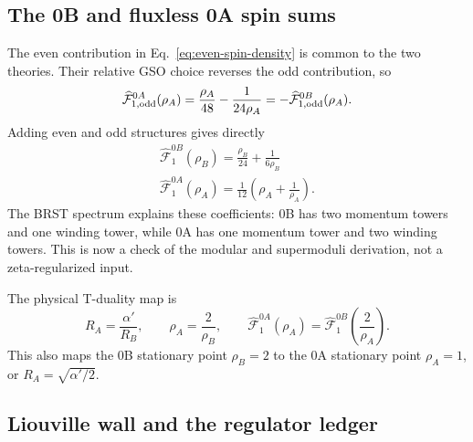 \documentclass[11pt]{article}
\newcommand{\ap}{\alpha'}
\begin{document}
\subsection{The 0B and fluxless 0A spin sums}

The even contribution in Eq.~\eqref{eq:even-spin-density} is common to the
two theories.  Their relative GSO choice reverses the odd contribution, so
\begin{equation}
 \widehat{\mathcal F}_{1,\rm odd}^{0A}(\rho_A)
 =\frac{\rho_A}{48}-\frac1{24\rho_A}
 =-\widehat{\mathcal F}_{1,\rm odd}^{0B}(\rho_A).
 \label{eq:odd-spin-density-0a}
\end{equation}
Adding even and odd structures gives directly
\begin{align}
 \boxed{
 \widehat{\mathcal F}^{0B}_1(\rho_B)
 =\frac{\rho_B}{24}+\frac1{6\rho_B}}
 \label{eq:bry-spectrum-torus}\\[3pt]
 \boxed{
 \widehat{\mathcal F}^{0A}_1(\rho_A)
 =\frac1{12}\left(\rho_A+\frac1{\rho_A}\right)}.
 \label{eq:bry-spectrum-torus-0a}
\end{align}
The BRST spectrum explains these coefficients: 0B has two momentum towers
and one winding tower, while 0A has one momentum tower and two winding
towers.  This is now a check of the modular and supermoduli derivation, not
a zeta-regularized input.

The physical T-duality map is
\begin{equation}
 R_A=\frac{\ap}{R_B},
 \qquad \rho_A=\frac2{\rho_B},
 \qquad
 \widehat{\mathcal F}^{0A}_1(\rho_A)
 =\widehat{\mathcal F}^{0B}_1\!\left(\frac2{\rho_A}\right).
 \label{eq:0a-0b-t-duality}
\end{equation}
This also maps the 0B stationary point $\rho_B=2$ to the 0A stationary
point $\rho_A=1$, or $R_A=\sqrt{\ap/2}$.

\subsection{Liouville wall and the regulator ledger}
\end{document}
